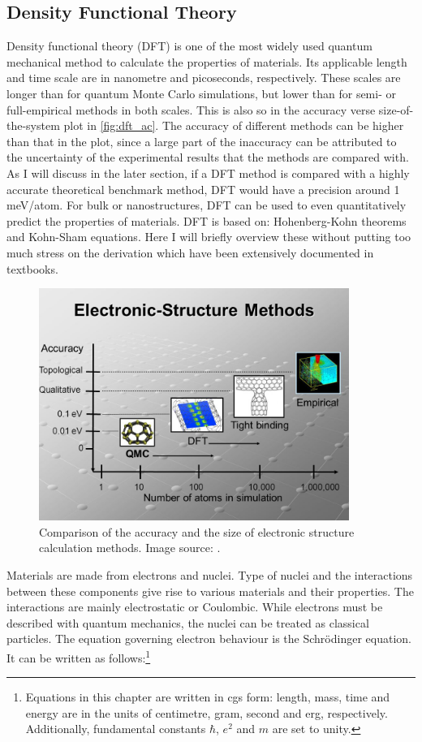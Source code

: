 \subsection{Density Functional Theory}
%
Density functional theory (DFT) is one of the most widely used quantum mechanical method to calculate the properties of materials. Its applicable length and time scale are in nanometre and picoseconds, respectively. These scales are longer than for quantum Monte Carlo simulations, but lower than for semi- or full-empirical methods in both scales. This is also so in the accuracy verse size-of-the-system plot in \autoref{fig:dft_ac}. The accuracy of different methods can be higher than that in the plot, since a large part of the inaccuracy can be attributed to the uncertainty of the experimental results that the methods are compared with\cite{Kirklin2015}. As I will discuss in the later section, if a DFT method is compared with a highly accurate theoretical benchmark method, DFT would have a precision around 1 meV/atom. For bulk or nanostructures, DFT can be used to even quantitatively predict the properties of materials. DFT is based on: Hohenberg-Kohn theorems\cite{Hohenberg1964} and Kohn-Sham equations\cite{Kohn1965}. Here I will briefly overview these without putting too much stress on the derivation which have been extensively documented in textbooks. 
%
\begin{figure}[htbp!] 
\centering  
\includegraphics[width=0.9\textwidth]{dft1.jpg}
\caption{ Comparison of the accuracy and the size of electronic structure calculation methods. Image source: \cite{dft_ac}.}  
\label{fig:dft_ac}
\end{figure} 
%
Materials are made from electrons and nuclei. Type of nuclei and the interactions between these components give rise to various materials and their properties. The interactions are mainly electrostatic or Coulombic. While electrons must be described with quantum mechanics, the nuclei can be treated as classical particles. The equation governing electron behaviour is the Schr\"{o}dinger equation. It can be written as follows:\footnote{Equations in this chapter are written in cgs form: length, mass, time and energy are in the units of centimetre, gram, second and erg, respectively. Additionally, fundamental constants $\hbar$, $e^2$ and $m$ are set to unity.}
